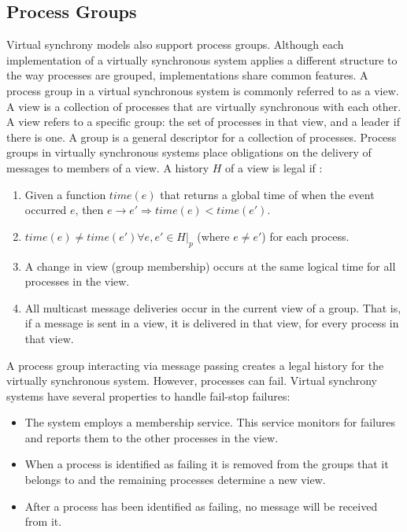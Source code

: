 \subsection{Process Groups}
Virtual synchrony models also support process groups. Although each implementation of a virtually synchronous system applies a different structure to the way processes are grouped, implementations share common features.
A process group in a virtual synchronous system is commonly referred to as a view. A view is a collection of processes that are virtually synchronous with each other. A view refers to a specific group: the set of processes in that view, and a leader if there is one. A group is a general descriptor for a collection of processes. Process groups in virtually synchronous systems place obligations on the delivery of messages to members of a view. A history $H$ of a view is legal if \cite[p~.103]{ISISTOOLKIT}:
\begin{enumerate}
    \item Given a function $time(e)$ that returns a global time of when the event occurred $e$, then $e \rightarrow e' \Rightarrow time(e) < time(e').$
    \item $time(e) \neq time(e') \forall e, e' \in H|_{p}$ (where $e \neq e'$) for each process.
    \item A change in view (group membership) occurs at the same logical time for all processes in the view.
    \item All multicast message deliveries occur in the current view of a group. That is, if a message is sent in a view, it is delivered in that view, for every process in that view.
\end{enumerate}

A process group interacting via message passing creates a legal history for the virtually synchronous system. However, processes can fail.  Virtual synchrony systems have several properties to handle fail-stop failures\cite[p~.102]{ISISTOOLKIT}:

\begin{itemize}
    \item The system employs a membership service. This service monitors for failures and reports them to the other processes in the view.
    \item When a process is identified as failing it is removed from the groups that it belongs to and the remaining processes determine a new view.
    \item After a process has been identified as failing, no message will be received from it.
\end{itemize}


